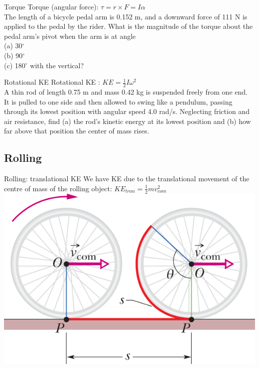 \begin{frame}{Torque}
\small
Torque (angular force): $\tau = r \times F = I\alpha$\\[1ex]
The length of a bicycle pedal arm is 0.152 m, and a downward force of 111 N is applied to the pedal by the rider. What is the magnitude of the torque about the pedal arm's pivot when the arm is at angle \\
(a) 30$^{\circ}$\\[1ex]
 (b) 90$^{\circ}$\\[1ex]
 (c) 180$^{\circ}$ with the vertical?\\[1ex]
\end{frame}

\begin{frame}{Rotational KE}
\small
Rotational KE : $KE = \frac{1}{2}I\omega^2$\\[1ex]
A thin rod of length 0.75 m and mass 0.42 kg is suspended freely from one end. It is pulled to one side and then allowed to swing like a pendulum, passing through its lowest position with angular speed 4.0 rad/s. Neglecting friction and air resistance, find (a) the rod's kinetic energy at its lowest position and (b) how far above that position the center of mass rises.
\end{frame}



 \subsection{Rolling}
 
\begin{frame}{Rolling: translational KE}
\small
We have KE due to the translational movement of the centre of mass of the rolling object: $KE_{tran} = \frac{1}{2}mv_{com}^2$\\[1ex]
\includegraphics[scale=1]{vcom}
\end{frame}

